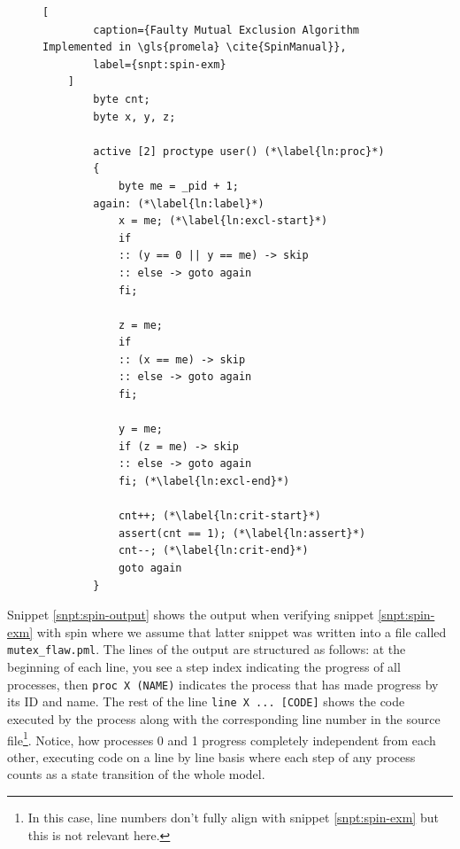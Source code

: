 \begin{figure}
    \begin{lstlisting}[
        caption={Faulty Mutual Exclusion Algorithm Implemented in \gls{promela} \cite{SpinManual}},
        label={snpt:spin-exm}
    ]
        byte cnt;
        byte x, y, z;

        active [2] proctype user() (*\label{ln:proc}*)
        {
            byte me = _pid + 1;
        again: (*\label{ln:label}*)
            x = me; (*\label{ln:excl-start}*)
            if
            :: (y == 0 || y == me) -> skip
            :: else -> goto again
            fi;

            z = me;
            if
            :: (x == me) -> skip
            :: else -> goto again
            fi;

            y = me;
            if (z = me) -> skip
            :: else -> goto again
            fi; (*\label{ln:excl-end}*)

            cnt++; (*\label{ln:crit-start}*)
            assert(cnt == 1); (*\label{ln:assert}*)
            cnt--; (*\label{ln:crit-end}*)
            goto again
        }
    \end{lstlisting}
\end{figure}

Snippet \ref{snpt:spin-output} shows the output when verifying snippet \ref{snpt:spin-exm} with \gls{spin} where we assume that latter snippet was written into a file called \lstinline{mutex_flaw.pml}.
The lines of the output are structured as follows: at the beginning of each line, you see a step index indicating the progress of all processes, then \lstinline{proc X (NAME)} indicates the process that has made progress by its ID and name.
The rest of the line \lstinline{line X ... [CODE]} shows the code executed by the process along with the corresponding line number in the source file\footnote{%
    In this case, line numbers don't fully align with snippet \ref{snpt:spin-exm} but this is not relevant here.
}.
Notice, how processes 0 and 1 progress completely independent from each other, executing code on a line by line basis where each step of any process counts as a state transition of the whole model.

